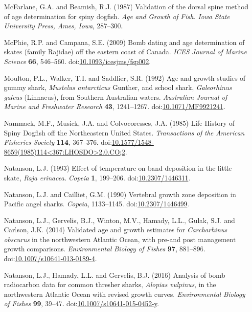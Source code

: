 \documentclass[]{article}
\begin{document}
\hypertarget{ref-mcfarlane_validation_1987}{}
McFarlane, G.A. and Beamish, R.J. (1987) Validation of the dorsal spine
method of age determination for spiny dogfish. \emph{Age and Growth of
Fish. Iowa State University Press, Ames, Iowa}, 287--300.

\hypertarget{ref-mcphie_bomb_2009}{}
McPhie, R.P. and Campana, S.E. (2009) Bomb dating and age determination
of skates (family Rajidae) off the eastern coast of Canada. \emph{ICES
Journal of Marine Science} \textbf{66}, 546--560.
doi:\href{https://doi.org/10.1093/icesjms/fsp002}{10.1093/icesjms/fsp002}.

\hypertarget{ref-moulton_age_1992}{}
Moulton, P.L., Walker, T.I. and Saddlier, S.R. (1992) Age and
growth-studies of gummy shark, \emph{Mustelus antarcticus} Gunther, and
school shark, \emph{Galeorhinus galeus} (Linnaeus), from Southern
Australian waters. \emph{Australian Journal of Marine and Freshwater
Research} \textbf{43}, 1241--1267.
doi:\href{https://doi.org/10.1071/MF9921241}{10.1071/MF9921241}.

\hypertarget{ref-nammack_life_1985}{}
Nammack, M.F., Musick, J.A. and Colvocoresses, J.A. (1985) Life History
of Spiny Dogfish off the Northeastern United States. \emph{Transactions
of the American Fisheries Society} \textbf{114}, 367--376.
doi:\href{https://doi.org/10.1577/1548-8659(1985)114\%3C367:LHOSDO\%3E2.0.CO;2}{10.1577/1548-8659(1985)114\textless{}367:LHOSDO\textgreater{}2.0.CO;2}.

\hypertarget{ref-natanson_effect_1993}{}
Natanson, L.J. (1993) Effect of temperature on band deposition in the
little skate, \emph{Raja erinacea}. \emph{Copeia} \textbf{1}, 199--206.
doi:\href{https://doi.org/10.2307/1446311}{10.2307/1446311}.

\hypertarget{ref-natanson_vertebral_1990}{}
Natanson, L.J. and Cailliet, G.M. (1990) Vertebral growth zone
deposition in Pacific angel sharks. \emph{Copeia}, 1133--1145.
doi:\href{https://doi.org/10.2307/1446499}{10.2307/1446499}.

\hypertarget{ref-natanson_validated_2014}{}
Natanson, L.J., Gervelis, B.J., Winton, M.V., Hamady, L.L., Gulak, S.J.
and Carlson, J.K. (2014) Validated age and growth estimates for
\emph{Carcharhinus obscurus} in the northwestern Atlantic Ocean, with
pre-and post management growth comparisons. \emph{Environmental Biology
of Fishes} \textbf{97}, 881--896.
doi:\href{https://doi.org/10.1007/s10641-013-0189-4}{10.1007/s10641-013-0189-4}.

\hypertarget{ref-natanson_analysis_2016}{}
Natanson, L.J., Hamady, L.L. and Gervelis, B.J. (2016) Analysis of bomb
radiocarbon data for common thresher sharks, \emph{Alopias vulpinus}, in
the northwestern Atlantic Ocean with revised growth curves.
\emph{Environmental Biology of Fishes} \textbf{99}, 39--47.
doi:\href{https://doi.org/10.1007/s10641-015-0452-y}{10.1007/s10641-015-0452-y}.
\end{document}
